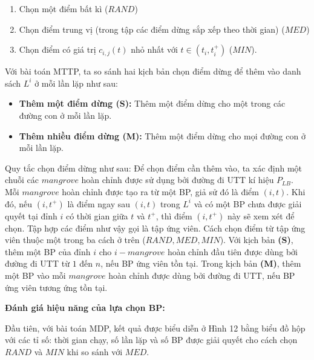 \documentclass[../main.tex]{subfiles}
\begin{document}
\begin{enumerate}
\def\labelenumi{\arabic{enumi}.}
\tightlist
\item
  Chọn một điểm bất kì (\(RAND\))
\item
  Chọn điểm trung vị (trong tập các điểm dừng sắp xếp theo thời gian)
  (\(MED\))
\item
  Chọn điểm có giá trị \(c_{i, j}(t)\) nhỏ nhất với
  \(t\in (t_i, t_i^+)\) (\(MIN\)).
\end{enumerate}

Với bài toán MTTP, ta so sánh hai kịch bản chọn điểm dừng để thêm vào
danh sách \(L^i\) ở mỗi lần lặp như sau:

\begin{itemize}
\tightlist
\item
  \textbf{Thêm một điểm dừng (S):} Thêm một điểm dừng cho một trong các
  đường con ở mỗi lần lặp.
\item
  \textbf{Thêm nhiều điểm dừng (M):} Thêm một điểm dừng cho mọi đường
  con ở mỗi lần lặp.
\end{itemize}

Quy tắc chọn điểm dừng như sau: Để chọn điểm cần thêm vào, ta xác định
một chuỗi các \(mangrove\) hoàn chỉnh được sử dụng bởi đường đi UTT kí
hiệu \(P_{LB}\). Mỗi \(mangrove\) hoàn chỉnh được tạo ra từ một BP, giả
sử đó là điểm \((i,t)\). Khi đó, nếu \((i,t^+)\) là điểm ngay sau
\((i,t)\) trong \(L^i\) và có một BP chưa được giải quyết tại đỉnh \(i\)
có thời gian giữa \(t\) và \(t^+\), thì điểm \((i,t^+)\) này sẽ xem xét
để chọn. Tập hợp các điểm như vậy gọi là tập ứng viên. Cách chọn điểm từ
tập ứng viên thuộc một trong ba cách ở trên (\(RAND, MED, MIN\)). Với
kịch bản \textbf{(S)}, thêm một BP của đỉnh \(i\) cho \(i-mangrove\)
hoàn chỉnh đầu tiên được dùng bởi đường đi UTT từ \(1\) đến \(n\), nếu
BP ứng viên tồn tại. Trong kịch bản \textbf{(M)}, thêm một BP vào mỗi
\(mangrove\) hoàn chỉnh được dùng bởi đường đi UTT, nếu BP ứng viên
tương ứng tồn tại.

\textbf{Đánh giá hiệu năng của lựa chọn BP:}

Đầu tiên, với bài toán MDP, kết quả được biểu diễn ở Hình 12 bằng biểu
đồ hộp với các tỉ số: thời gian chạy, số lần lặp và số BP được giải
quyết cho cách chọn \(RAND\) và \(MIN\) khi so sánh với \(MED\).
\end{document}
